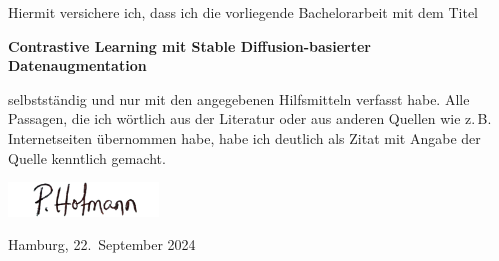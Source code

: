 Hiermit versichere ich, dass ich die vorliegende Bachelorarbeit mit dem Titel
\begin{center}
  \textbf{Contrastive Learning mit Stable Diffusion-basierter Datenaugmentation}
\end{center}
selbstständig und nur mit den angegebenen Hilfsmitteln verfasst habe.  Alle
Passagen, die ich wörtlich aus der Literatur oder aus anderen Quellen wie
z.\,B. Internetseiten übernommen habe, habe ich deutlich als Zitat mit Angabe
der Quelle kenntlich gemacht.

\vspace{2cm}

\includegraphics[width=4cm]{Unterschrift.jpg}

Hamburg, 22.\ September 2024
